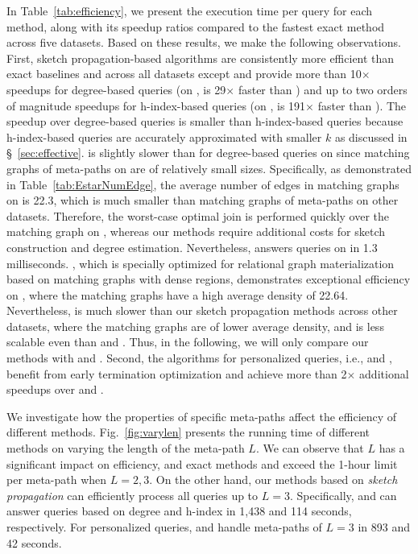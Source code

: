 In Table~\ref{tab:efficiency}, we present the execution time per query for each method, along with its speedup ratios compared to the fastest exact method across five datasets.
Based on these results, we make the following observations.
First, sketch propagation-based algorithms are consistently more efficient than exact baselines \wcd and \wch across all datasets except \dsimdb and provide more than 10$\times$ speedups for degree-based queries (on \dsfreebase, \glod is 29$\times$ faster than \wcd) and up to two orders of magnitude speedups for h-index-based queries (on \dsfreebase, \gloh is 191$\times$ faster than \wch).
The speedup over degree-based queries is smaller than h-index-based queries because h-index-based queries are accurately approximated with smaller $k$ as discussed in \S~\ref{sec:effective}.
\glod is slightly slower than \wcd for degree-based queries on \dsimdb since matching graphs of meta-paths on \dsimdb are of relatively small sizes. Specifically, as demonstrated in Table~\ref{tab:EstarNumEdge}, the average number of edges in matching graphs on \dsimdb is 22.3, which is much smaller than matching graphs of meta-paths on other datasets. Therefore, the worst-case optimal join is performed quickly over the matching graph on \dsimdb, whereas our methods require additional costs for sketch construction and degree estimation.
Nevertheless, \glod answers \ced queries on \dsimdb in 1.3 milliseconds.
\boolapp, which is specially optimized for relational graph materialization based on matching graphs with dense regions, demonstrates exceptional efficiency on \dsacm, where the matching graphs have a high average density of 22.64.
Nevertheless, \boolapp is much slower than our sketch propagation methods across other datasets, where the matching graphs are of lower average density, and is less scalable even than \wcd and \wch.
Thus, in the following, we will only compare our methods with \wcd and \wch.
Second, the algorithms for personalized queries, i.e., \perde and \perhe, benefit from early termination optimization and achieve more than 2$\times$ additional speedups over \perd and \perh.

We investigate how the properties of specific meta-paths affect the efficiency of different methods.
Fig.~\ref{fig:varylen} presents the running time of different methods on \dsyelp varying the length of the meta-path $L$. We can observe that $L$ has a significant impact on efficiency, and exact methods \wcd and \wch exceed the 1-hour limit per meta-path when $L=2,3$. On the other hand, our methods based on \emph{sketch propagation} can efficiently process all queries up to $L=3$. Specifically, \glod and \gloh can answer \ced queries based on degree and h-index in 1,438 and 114 seconds, respectively. For personalized queries, \perhe and \perde handle meta-paths of $L=3$ in 893 and 42 seconds.

